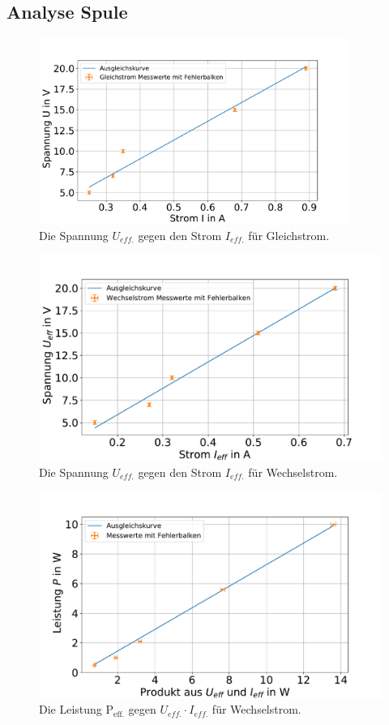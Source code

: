 \subsection{Analyse Spule}\label{kap:Spule}
\begin{figure}[h]
	\centering
	\includegraphics[width=0.9\textwidth]{res/UgegenI_GL.pdf}
	\caption{Die Spannung $U_{eff.}$ gegen den Strom $I_{eff.}$ für Gleichstrom.}
	\label{fig:UgegenIgl}
\end{figure}
\begin{figure}[h]
	\centering
	\includegraphics[width=0.9\linewidth]{res/UgegenI_W.pdf}
	\caption{Die Spannung $U_{eff.}$ gegen den Strom $I_{eff.}$ für Wechselstrom.}
	\label{fig:UgegenIw}
\end{figure}
\begin{figure}[h]
	\centering
	\includegraphics[width=0.9\linewidth]{res/PgegenUI.pdf}
	\caption{Die Leistung P$_\text{eff.}$ gegen $U_{eff.} \cdot I_{eff.}$ für Wechselstrom.}
	\label{fig:PgegenUI}
\end{figure}
